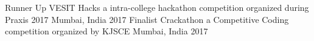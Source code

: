 \begin{cvhonors}
  \cvhonor
    {Runner Up}
    {VESIT Hacks a intra-college hackathon competition organized during Praxis 2017}
    {Mumbai, India}
    {2017}
  \cvhonor
    {Finalist}
    {Crackathon a Competitive Coding competition organized by KJSCE}
    {Mumbai, India}
    {2017}
\end{cvhonors}

